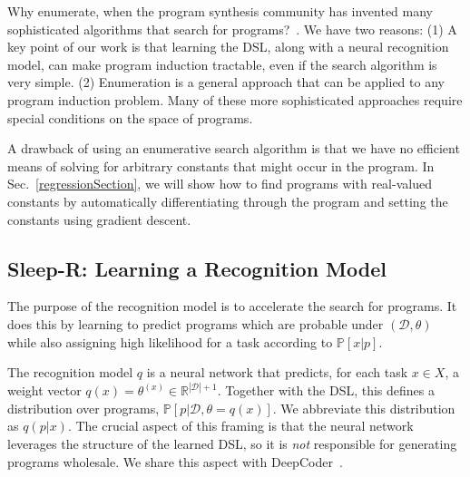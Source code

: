 \documentclass{article}
\newcommand{\probability}{\mathds{P}} %
\begin{document}
Why enumerate, when the program synthesis community has invented many
sophisticated algorithms that search for programs?~\cite{solar2008program,schkufza2013stochastic,feser2015synthesizing,osera2015type,polozov2015flashmeta}.
We have two reasons:
(1) A key point of our work is that learning the DSL, along with a neural recognition model, can make program induction tractable, even if the search algorithm is very simple.
(2) Enumeration is a general approach that can be applied to any program induction problem. Many of these more sophisticated approaches require special conditions on
  the space of  programs.

A drawback of using an enumerative search algorithm is that we have no
efficient means of solving for arbitrary constants that might occur in the
program. In Sec.~\ref{regressionSection},
we will show how to find programs with real-valued constants
by automatically differentiating through the program and setting the constants using gradient descent.







\subsection{Sleep-R: Learning a Recognition Model}\label{recognitionSection}

The purpose of the recognition model is to accelerate the search for
programs.  It does this by learning to predict programs which are probable
under $(\mathcal{D},\theta)$ while also assigning high likelihood for a task
according to $\probability[x|p]$.

The recognition model $q$ is a neural network that predicts,
for each task $x\in X$, a weight vector $q(x) = \theta^{(x)}\in \mathbb{R}^{|\mathcal{D}| + 1}$.
Together with the DSL, this defines a distribution over programs,
$\probability[p|\mathcal{D},\theta = q(x)]$.
We abbreviate this distribution as $q(p|x)$.
The crucial aspect of this framing is that the neural network
leverages the structure of the learned DSL,
so it is \emph{not} responsible for
generating programs wholesale.
We share this aspect with DeepCoder~\cite{balog2016deepcoder}.
\end{document}
